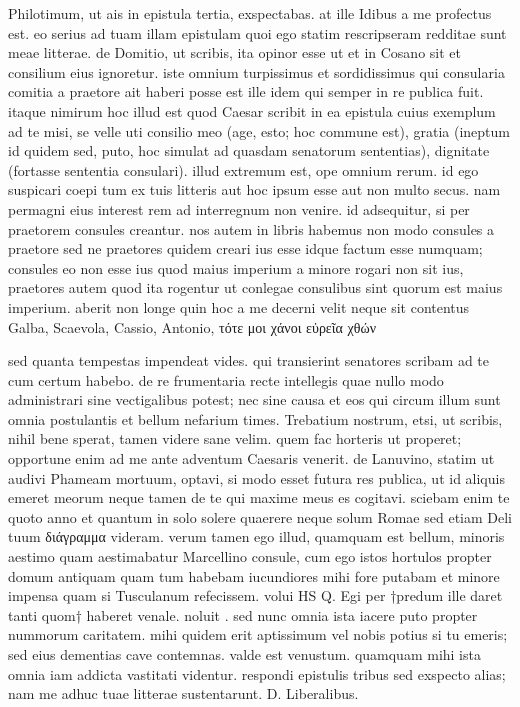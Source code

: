  Philotimum, ut ais in epistula tertia, exspectabas. at ille Idibus a me profectus est. eo serius ad tuam illam epistulam quoi ego statim rescripseram redditae sunt meae litterae. de Domitio, ut scribis, ita opinor esse ut et in Cosano sit et consilium eius ignoretur. iste omnium turpissimus et sordidissimus qui consularia comitia a praetore ait haberi posse est ille idem qui semper in re publica fuit. itaque nimirum hoc illud est quod Caesar scribit in ea epistula cuius exemplum ad te misi, se velle uti consilio meo (age, esto; hoc commune est), gratia (ineptum id quidem sed, puto, hoc simulat ad quasdam senatorum sententias), dignitate (fortasse sententia consulari). illud extremum est, ope omnium rerum. id ego suspicari coepi tum ex tuis litteris aut hoc ipsum esse aut non multo secus. nam permagni eius interest rem ad interregnum non venire. id adsequitur, si per praetorem consules creantur. nos autem in libris habemus non modo consules a praetore sed ne praetores quidem creari ius esse idque factum esse numquam; consules eo non esse ius quod maius imperium a minore rogari non sit ius, praetores autem quod ita rogentur ut conlegae consulibus sint quorum est maius imperium. aberit non longe quin hoc a me decerni velit neque sit contentus Galba, Scaevola, Cassio, Antonio, τότε μοι χάνοι εὐρεῖα χθών

 sed quanta tempestas impendeat vides. qui transierint senatores scribam ad te cum certum habebo. de re frumentaria recte intellegis quae nullo modo administrari sine vectigalibus potest; nec sine causa et eos qui circum illum sunt omnia postulantis et bellum nefarium times. Trebatium nostrum, etsi, ut scribis, nihil bene sperat, tamen videre sane velim. quem fac horteris ut properet; opportune enim ad me ante adventum Caesaris venerit. de Lanuvino, statim ut audivi Phameam mortuum, optavi, si modo esset futura res publica, ut id aliquis emeret meorum neque tamen de te qui maxime meus es cogitavi. sciebam enim te quoto anno et quantum in solo solere quaerere neque solum Romae sed etiam Deli tuum διάγραμμα videram. verum tamen ego illud, quamquam est bellum, minoris aestimo quam aestimabatur Marcellino consule, cum ego istos hortulos propter domum antiquam quam tum habebam iucundiores mihi fore putabam et minore impensa quam si Tusculanum refecissem. volui HS Q. Egi per †predum ille daret tanti quom† haberet venale. noluit . sed nunc omnia ista iacere puto propter nummorum caritatem. mihi quidem erit aptissimum vel nobis potius si tu emeris; sed eius dementias cave contemnas. valde est venustum. quamquam mihi ista omnia iam addicta vastitati videntur. respondi epistulis tribus sed exspecto alias; nam me adhuc tuae litterae sustentarunt. D. Liberalibus.
